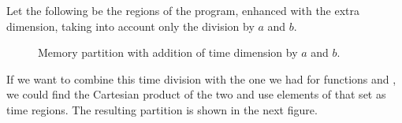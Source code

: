 \documentclass[..thesis.tex]{subfiles}
\newcommand{\opacity}{0.8}
\newcommand{\drawcube}[7]
{
      \filldraw[opacity=\opacity, #7, draw=black, dashed, xzp=#2] (#1,#3) rectangle (#4,#6);
      \filldraw[opacity=\opacity, #7, draw=black, dashed, xzp=#5] (#1,#3) rectangle (#4,#6);
      \filldraw[opacity=\opacity, #7, draw=black, dashed, xyp=#3] (#1,#2) rectangle (#4,#5);
      \filldraw[opacity=\opacity, #7, draw=black, dashed, xyp=#6] (#1,#2) rectangle (#4,#5);
      \filldraw[opacity=\opacity, #7, draw=black, dashed, yzp=#4] (#2,#3) rectangle (#5,#6);
}
\newcommand{\drawcubeoverz}[5]
{
 \drawcube{#1}{#2}{0}{#3}{#4}{\cubez}{#5}
}
\newcommand{\drawoutercube}
{
      \draw[thick,-] (0,0,0) -- ++(\cubex,0,0) -- ++(0,0,\cubez) -- node [anchor = north] {$B$} ++(-0.5*\cubex,0,0) --  node [anchor = north] {$A$} ++(-0.5*\cubex,0,0)  --   ++(0,0,-\cubez);
      \draw[thick,-] (0,\cubey,0) -- ++(\cubex,0,0) -- ++(0,0,\cubez) -- ++(-\cubex,0,0) --   ++(0,0,-\cubez)  ;

      \draw[thick,-] (0,0,0) -- (0,\cubey,0);
      \draw[thick,-] (\cubex,0,0) -- (\cubex,\cubey,0);
      \draw[thick,-] (\cubex,0,\cubez) -- ++(0,\cubey,0);
      \draw[thick,-] (0,0,\cubez) -- (0,\cubey,\cubez);
}
\newcommand{\aColor}{blue}
\newcommand{\aLColor}{\aColor!30}
\newcommand{\aRColor}{\aColor!75}
\newcommand{\bColor}{green}
\newcommand{\bLColor}{\bColor!50}
\newcommand{\bRColor}{\bColor!95}
\newcommand{\defaultColor}{red}
\newcommand{\defaultLColor}{\defaultColor!30}
\newcommand{\defaultRColor}{\defaultColor!75}
\begin{document}
Let the following be the regions of the program, enhanced with the extra dimension, taking into account only the division by $a$ and $b$.




\begin{figure}[H]
  \centering
    \caption{Memory partition with addition of time dimension by $a$ and $b$.}
\end{figure}

If we want to combine this time division with the one we had for functions  and , we could find the Cartesian product of the two and use elements of that set as time regions. The resulting partition is shown in the next figure.
\end{document}
